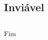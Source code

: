 \documentclass{beamer}
\begin{document}
\begin{frame}
{	}
\end{frame}


\subsection{Inviável}

\subsection{ } 
	
\begin{frame}
\Huge{\centerline{Fim}}
\end{frame}

\end{document}
